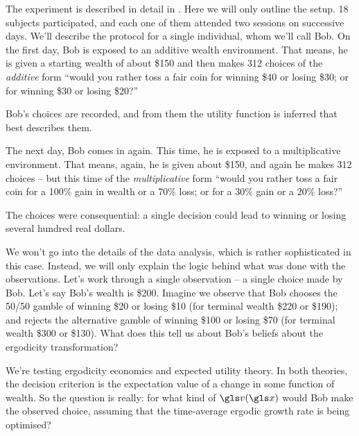 The experiment is described in detail in \cite{MederETAL2019}. Here we will only outline the setup. 
18 subjects participated, and each one of them attended two sessions on successive days.
We'll describe the protocol for a single individual, whom we'll call Bob. On the first day, Bob 
is exposed to an additive wealth environment. That means, he is given a starting wealth of 
about \$150 and then makes 312 choices of the {\it additive} form ``would you rather toss a fair 
coin for winning \$40 or losing \$30; or for winning \$30 or losing \$20?'' 

Bob's choices are recorded, and from them the utility function is inferred that best describes them. 

The next day, Bob comes in again. This time, he is exposed to a multiplicative environment. That means, again, 
he is given about \$150, and again he makes 
312 choices -- but this time of the {\it multiplicative} form ``would you rather toss a fair coin for a 
100\% gain in wealth or a 70\% loss; or for a 30\% gain or a 20\% loss?''

The choices were consequential: a single decision could lead to winning or losing several 
hundred real dollars. 

We won't go into the details of the data analysis, which is rather sophisticated in this case. Instead, 
we will only explain the logic behind what was done with the observations. 
Let's work through a single observation -- a single choice made by Bob. 
Let's say Bob's wealth is \$200. Imagine we observe that Bob chooses 
the 50/50 gamble of winning \$20 or losing \$10 (for terminal  wealth \$220 or \$190); and rejects the alternative gamble of winning \$100 or losing \$70 (for terminal wealth \$300 or \$130). 
What does this tell us about Bob's beliefs about the ergodicity transformation?

We're testing ergodicity economics and expected utility theory. In both theories, the decision criterion
is the expectation value of a change in some function of wealth. So the question is really:
for what kind of $\gv(\x)$ would Bob make the observed choice, assuming that
the time-average ergodic growth rate is being optimised?

